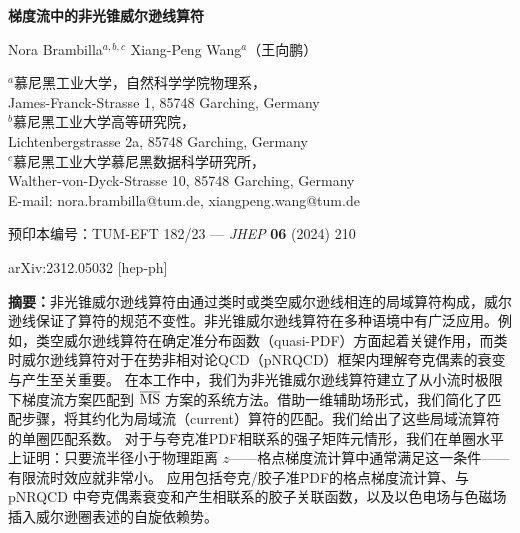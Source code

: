 \documentclass[11pt]{ctexart}
\begin{document}
\begin{center}
{\LARGE\bfseries 梯度流中的非光锥威尔逊线算符\par}
\vspace{1.2em}
{\large Nora Brambilla$^{a,b,c}$ \quad Xiang-Peng Wang$^{a}$（王向鹏）\par}
\vspace{0.8em}
{\small
$^{a}$慕尼黑工业大学，自然科学学院物理系，\\
James-Franck-Strasse 1, 85748 Garching, Germany\\[3pt]
$^{b}$慕尼黑工业大学高等研究院，\\ Lichtenbergstrasse 2a, 85748 Garching, Germany\\[3pt]
$^{c}$慕尼黑工业大学慕尼黑数据科学研究所，\\ Walther-von-Dyck-Strasse 10, 85748 Garching, Germany\\[6pt]
E-mail: nora.brambilla@tum.de, xiangpeng.wang@tum.de\par}
\vspace{0.8em}
{\small 预印本编号：TUM-EFT 182/23 --- \emph{JHEP} {\bfseries 06} (2024) 210\par}
{\small arXiv:2312.05032 [hep-ph]\par}
\end{center}

\vspace{1em}

\noindent\textbf{摘要：}非光锥威尔逊线算符由通过类时或类空威尔逊线相连的局域算符构成，威尔逊线保证了算符的规范不变性。非光锥威尔逊线算符在多种语境中有广泛应用。例如，类空威尔逊线算符在确定准分布函数（quasi-PDF）方面起着关键作用，而类时威尔逊线算符对于在势非相对论QCD（pNRQCD）框架内理解夸克偶素的衰变与产生至关重要。
在本工作中，我们为非光锥威尔逊线算符建立了从小流时极限下梯度流方案匹配到 $\overline{\rm MS}$ 方案的系统方法。借助一维辅助场形式，我们简化了匹配步骤，将其约化为局域流（current）算符的匹配。我们给出了这些局域流算符的单圈匹配系数。
对于与夸克准PDF相联系的强子矩阵元情形，我们在单圈水平上证明：只要流半径小于物理距离 $z$——格点梯度流计算中通常满足这一条件——有限流时效应就非常小。
应用包括夸克/胶子准PDF的格点梯度流计算、与 pNRQCD 中夸克偶素衰变和产生相联系的胶子关联函数，以及以色电场与色磁场插入威尔逊圈表述的自旋依赖势。

\vspace{1.5em}







\end{document}
